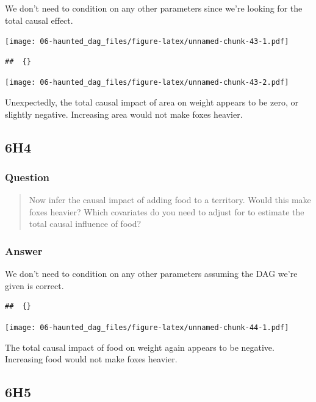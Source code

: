 \documentclass[
]{book}
\begin{document}
We don't need to condition on any other parameters since we're looking for the total causal effect.

\texttt{[image: 06-haunted\_dag\_files/figure-latex/unnamed-chunk-43-1.pdf]}

\begin{verbatim}
##  {}
\end{verbatim}

\texttt{[image: 06-haunted\_dag\_files/figure-latex/unnamed-chunk-43-2.pdf]}

Unexpectedly, the total causal impact of area on weight appears to be zero, or slightly negative. Increasing area would not make foxes heavier.

\hypertarget{h4-2}{%
\subsection*{6H4}\label{h4-2}}

\hypertarget{question-58}{%
\subsubsection*{Question}\label{question-58}}

\begin{quote}
Now infer the causal impact of adding food to a territory. Would this make foxes heavier? Which covariates do you need to adjust for to estimate the total causal influence of food?
\end{quote}

\hypertarget{answer-58}{%
\subsubsection*{Answer}\label{answer-58}}

We don't need to condition on any other parameters assuming the DAG we're given is correct.

\begin{verbatim}
##  {}
\end{verbatim}

\texttt{[image: 06-haunted\_dag\_files/figure-latex/unnamed-chunk-44-1.pdf]}

The total causal impact of food on weight again appears to be negative. Increasing food would not make foxes heavier.

\hypertarget{h5-1}{%
\subsection*{6H5}\label{h5-1}}
\end{document}
